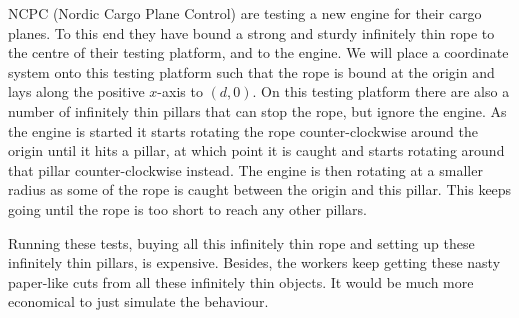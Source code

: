 

NCPC (Nordic Cargo Plane Control) are testing a new engine for their cargo planes. To this end they have bound a strong
and sturdy infinitely thin rope to the centre of their testing platform, and to the engine. We will place a coordinate system
onto this testing platform such that the rope is bound at the origin and lays along the positive $x$-axis to $(d, 0)$.
On this testing platform there are also a number of infinitely thin pillars that can stop the rope, but ignore the engine.
As the engine is started it starts rotating the rope counter-clockwise around the origin until it hits a pillar, at which point it 
is caught and starts rotating around that pillar counter-clockwise instead. The engine is then rotating at a smaller radius as some of
the rope is caught between the origin and this pillar. This keeps going until the rope is too short to reach any other pillars.

Running these tests, buying all this infinitely thin rope and setting up these infinitely thin pillars, is expensive. Besides, the
workers keep getting these nasty paper-like cuts from all these infinitely thin objects. It would be much more economical to just
simulate the behaviour. 

